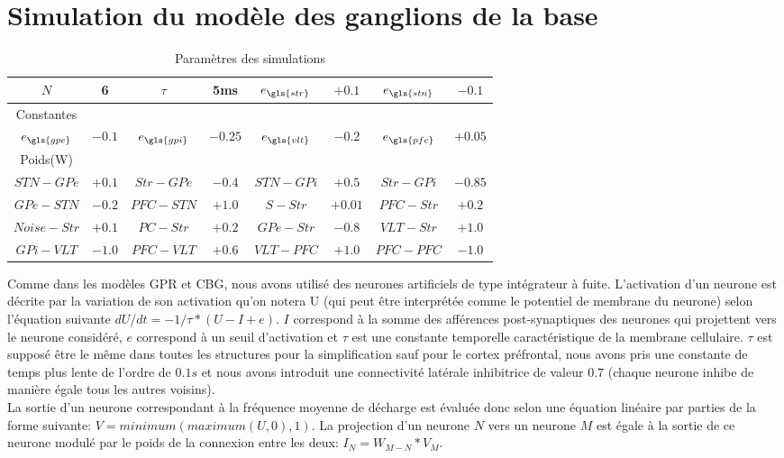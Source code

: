 \section{Simulation du modèle des ganglions de la base}
\begin{table}[h]
  \begin{center}
    \begin{tabular}{|c|c||c|c||c|c||c|c|}
      \hline
      $N$   & 6   & $\tau$   & 5ms &  $e_{\gls{str}}$ & $+0.1$ & $e_{\gls{stn}}$ & $-0.1$  \\
      \hline
      Constantes  \\
      \hline
      $e_{\gls{gpe}}$ & $-0.1$ & $e_{\gls{gpi}}$ & $-0.25$ &  $e_{\gls{vlt}}$ & $-0.2$ & $e_{\gls{pfc}}$ & $+0.05$\\
      \hline
      Poids(W) \\
      \hline
       $STN-GPe$ & $+0.1$ &$Str-GPe$ & $-0.4$ & $STN-GPi$ & $+0.5$ & $Str-GPi$ & $-0.85$  \\
      \hline
       $GPe-STN$ & $-0.2$ &$PFC-STN$ & $+1.0$ & $S-Str$ & $+0.01$ & $PFC-Str$ & $+0.2$  \\
      \hline
       $Noise-Str$ & $+0.1$ &$PC-Str$ & $+0.2$ & $GPe-Str$ & $-0.8$ & $VLT-Str$ & $+1.0$  \\  
      \hline
       $GPi-VLT$ & $-1.0$ &$PFC-VLT$ & $+0.6$ & $VLT-PFC$ & $+1.0$ & $PFC-PFC$ & $-1.0$  \\      
\hline
    \end{tabular}
  \end{center}
\caption{Paramètres des simulations}
\label{param011}
\end{table}
Comme dans les modèles GPR et CBG, nous avons utilisé des neurones artificiels de type intégrateur à fuite. L'activation d'un neurone est décrite par la variation de son activation qu'on notera U (qui peut être interprétée comme le potentiel de membrane du neurone) selon l'équation suivante $dU/dt=-1/\tau*(U-I+e)$. $I$ correspond à la somme des afférences post-synaptiques des neurones qui projettent vers le neurone considéré, $e$ correspond à un seuil d'activation et $\tau$ est une constante temporelle caractéristique de la membrane cellulaire. $\tau$ est supposé être le même dans toutes les structures pour la simplification sauf pour le cortex préfrontal, nous avons pris une constante de temps plus lente de l'ordre de $0.1s$ et nous avons introduit une connectivité latérale inhibitrice de valeur $0.7$ (chaque neurone inhibe de manière égale tous les autres voisins).\\

La sortie d'un neurone correspondant à la fréquence moyenne de décharge est évaluée donc selon une équation linéaire par parties de la forme suivante: $V=minimum(maximum(U,0),1)$. La projection d'un neurone $N$ vers un neurone $M$ est égale à la sortie de ce neurone modulé par le poids de la connexion entre les deux: $I_{N}= W_{M-N}* V_{M} $.\\
 

